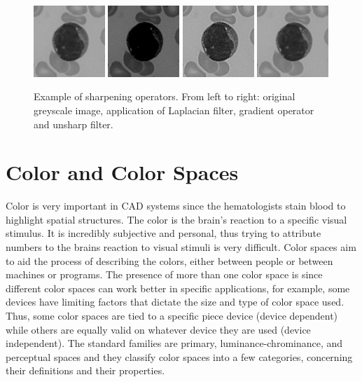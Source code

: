 \begin{figure}[!h]
	\centering
	\includegraphics[width=0.24\textwidth]{images/smooth0}
	\includegraphics[width=0.24\textwidth]{images/sharpen1}
	\includegraphics[width=0.24\textwidth]{images/sharpen2}
	\includegraphics[width=0.24\textwidth]{images/sharpen3}
	\caption[Example of sharpening operators.]{\label{fig:sharpening}Example of sharpening operators. From left to right: original greyscale image, application of Laplacian filter, gradient operator and unsharp filter.}
\end{figure}

\section{Color and Color Spaces} 
Color is very important in CAD systems since the hematologists stain blood to highlight spatial structures. The color is the brain's reaction to a specific visual stimulus. It is incredibly subjective and personal, thus trying to attribute numbers to the brains reaction to visual stimuli is very difficult. Color spaces aim to aid the process of describing the colors, either between people or between machines or programs. The presence of more than one color space is since different color spaces can work better in specific applications, for example, some devices have limiting factors that dictate the size and type of color space used. Thus, some color spaces are tied to a specific piece device (device dependent) while others are equally valid on whatever device they are used (device independent). The standard families are primary, luminance-chrominance, and perceptual spaces  \cite{Vandenbroucke, Busin} and they classify color spaces into a few categories, concerning their definitions and their properties.


